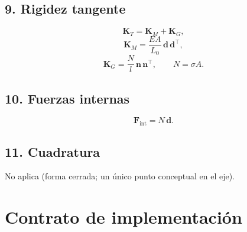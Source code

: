 \documentclass[11pt,letterpaper,oneside]{report}
\begin{document}
\subsection{9. Rigidez tangente}
\[
\mathbf K_T = \mathbf K_M + \mathbf K_G,
\]
\[
\mathbf K_M = \frac{E A}{L_0}\, \mathbf d\,\mathbf d^\top,
\]
\[
\mathbf K_G = \frac{N}{l}\, \mathbf n\,\mathbf n^\top, \qquad N = \sigma A.
\]

\subsection{10. Fuerzas internas}
\[
\mathbf F_{\text{int}} = N\, \mathbf d.
\]

\subsection{11. Cuadratura}
No aplica (forma cerrada; un único punto conceptual en el eje).


\section{Contrato de implementación}
\end{document}
